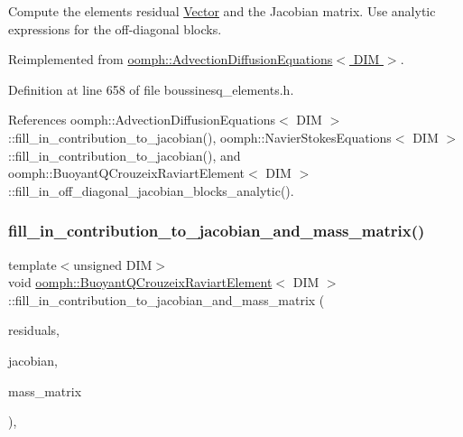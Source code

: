 Compute the element\textquotesingle{}s residual \hyperlink{classoomph_1_1Vector}{Vector} and the Jacobian matrix. Use analytic expressions for the off-\/diagonal blocks. 



Reimplemented from \hyperlink{classoomph_1_1AdvectionDiffusionEquations_a6ec1e0f92fa79998be9340ecfda4bcd5}{oomph\+::\+Advection\+Diffusion\+Equations$<$ D\+I\+M $>$}.



Definition at line 658 of file boussinesq\+\_\+elements.\+h.



References oomph\+::\+Advection\+Diffusion\+Equations$<$ D\+I\+M $>$\+::fill\+\_\+in\+\_\+contribution\+\_\+to\+\_\+jacobian(), oomph\+::\+Navier\+Stokes\+Equations$<$ D\+I\+M $>$\+::fill\+\_\+in\+\_\+contribution\+\_\+to\+\_\+jacobian(), and oomph\+::\+Buoyant\+Q\+Crouzeix\+Raviart\+Element$<$ D\+I\+M $>$\+::fill\+\_\+in\+\_\+off\+\_\+diagonal\+\_\+jacobian\+\_\+blocks\+\_\+analytic().

\mbox{\label{classoomph_1_1BuoyantQCrouzeixRaviartElement_a7d22156d87949e4c64d597d60fe00225}} 
\subsubsection{\texorpdfstring{fill\+\_\+in\+\_\+contribution\+\_\+to\+\_\+jacobian\+\_\+and\+\_\+mass\+\_\+matrix()}{fill\_in\_contribution\_to\_jacobian\_and\_mass\_matrix()}\hspace{0.1cm}{\footnotesize\ttfamily [1/3]}}
{\footnotesize\ttfamily template$<$unsigned D\+IM$>$ \\
void \hyperlink{classoomph_1_1BuoyantQCrouzeixRaviartElement}{oomph\+::\+Buoyant\+Q\+Crouzeix\+Raviart\+Element}$<$ D\+IM $>$\+::fill\+\_\+in\+\_\+contribution\+\_\+to\+\_\+jacobian\+\_\+and\+\_\+mass\+\_\+matrix (\begin{DoxyParamCaption}\item[{\hyperlink{classoomph_1_1Vector}{Vector}$<$ double $>$ \&}]{residuals,  }\item[{\hyperlink{classoomph_1_1DenseMatrix}{Dense\+Matrix}$<$ double $>$ \&}]{jacobian,  }\item[{\hyperlink{classoomph_1_1DenseMatrix}{Dense\+Matrix}$<$ double $>$ \&}]{mass\+\_\+matrix }\end{DoxyParamCaption})\hspace{0.3cm}{\ttfamily [inline]}, {\ttfamily [virtual]}}


